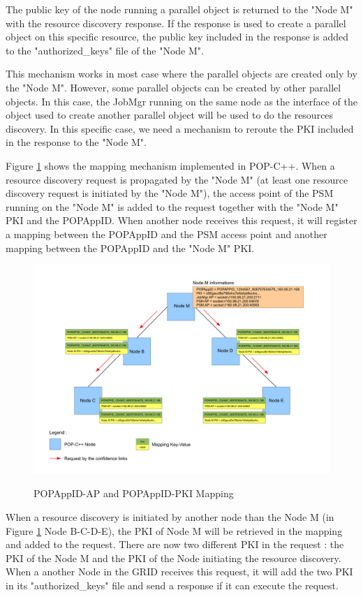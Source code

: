 The public key of the node running a parallel object is returned to the "Node M" with the resource discovery response. If the response is used to create a parallel object on this specific resource, the public key included in the response is added to the "authorized\_keys" file of the "Node M".\s

This mechanism works in most case where the parallel objects are created only by the "Node M". However, some parallel objects can be created by other parallel objects. In this case, the JobMgr running on the same node as the interface of the object used to create another parallel object will be used to do the resources discovery. In this specific case, we need a mechanism to reroute the PKI included in the response to the "Node M".\s

Figure \ref{fig:ap_mapping} shows the mapping mechanism implemented in POP-C++. When a resource discovery request is propagated by the "Node M" (at least one resource discovery request is initiated by the "Node M"), the access point of the PSM running on the "Node M" is added to the request together with the "Node M" PKI and the POPAppID. When another node receives this request, it will register a mapping between the POPAppID and the PSM access point and another mapping between the POPAppID and the "Node M" PKI. \s

\begin{figure}[ht]
	\caption{POPAppID-AP and POPAppID-PKI Mapping}
  	\centering
	\includegraphics[width=1.0\textwidth]{../ap_mapping.pdf}
	\label{fig:ap_mapping}
\end{figure}


When a resource discovery is initiated by another node than the Node M (in Figure \ref{fig:ap_mapping} Node B-C-D-E), the PKI of Node M will be retrieved in the mapping and added to the request. There are now two different PKI in the request : the PKI of the Node M and the PKI of the Node initiating the resource discovery. When a another Node in the GRID receives this request, it will add the two PKI in its "authorized\_keys" file and send a response if it can execute the request.\s

